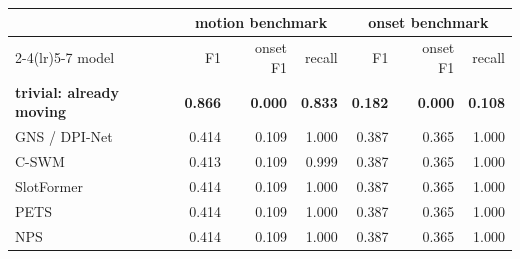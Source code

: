 \begin{tabular}{lrrrrrr}
\toprule
& \multicolumn{3}{c}{motion benchmark} & \multicolumn{3}{c}{onset benchmark} \\
\cmidrule(lr){2-4}\cmidrule(lr){5-7}
model & F1 & onset F1 & recall & F1 & onset F1 & recall \\
\midrule
\textbf{trivial: already moving} & \textbf{0.866} & \textbf{0.000} & \textbf{0.833} & \textbf{0.182} & \textbf{0.000} & \textbf{0.108} \\
\midrule
GNS / DPI-Net \citep{sanchezgonzalez2020gns,li2019dpinet} & 0.414 & 0.109 & 1.000 & 0.387 & 0.365 & 1.000 \\
C-SWM \citep{kipf2020cswm} & 0.413 & 0.109 & 0.999 & 0.387 & 0.365 & 1.000 \\
SlotFormer \citep{wu2023slotformer} & 0.414 & 0.109 & 1.000 & 0.387 & 0.365 & 1.000 \\
PETS \citep{chua2018pets} & 0.414 & 0.109 & 1.000 & 0.387 & 0.365 & 1.000 \\
NPS \citep{goyal2021nps} & 0.414 & 0.109 & 1.000 & 0.387 & 0.365 & 1.000 \\
\bottomrule
\end{tabular}
